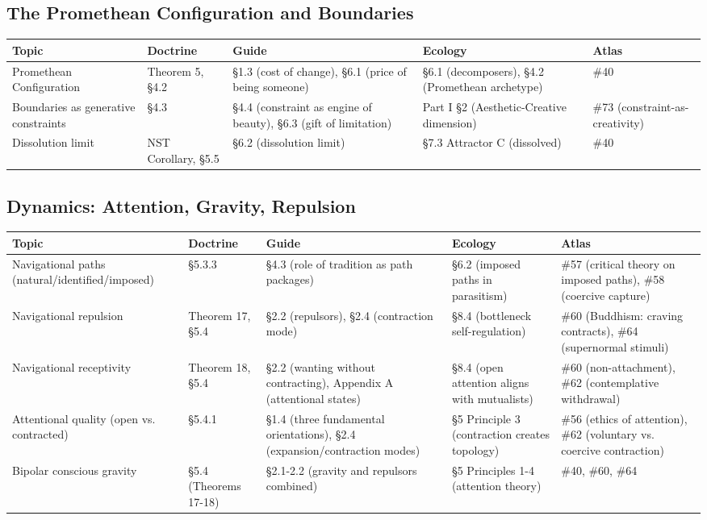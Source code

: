 \subsection*{The Promethean Configuration and Boundaries}



\begin{longtable}{p{} p{} p{} p{} p{}}
\toprule
\textbf{Topic} & \textbf{Doctrine} & \textbf{Guide} & \textbf{Ecology} & \textbf{Atlas} \\
\midrule
\endhead
Promethean Configuration & Theorem 5, §4.2 & §1.3 (cost of change), §6.1 (price of being someone) & §6.1 (decomposers), §4.2 (Promethean archetype) & \#40 \\
Boundaries as generative constraints & §4.3 & §4.4 (constraint as engine of beauty), §6.3 (gift of limitation) & Part I §2 (Aesthetic-Creative dimension) & \#73 (constraint-as-creativity) \\
Dissolution limit & NST Corollary, §5.5 & §6.2 (dissolution limit) & §7.3 Attractor C (dissolved) & \#40 \\
\bottomrule
\end{longtable}



\subsection*{Dynamics: Attention, Gravity, Repulsion}



\begin{longtable}{p{} p{} p{} p{} p{}}
\toprule
\textbf{Topic} & \textbf{Doctrine} & \textbf{Guide} & \textbf{Ecology} & \textbf{Atlas} \\
\midrule
\endhead
Navigational paths (natural/identified/imposed) & §5.3.3 & §4.3 (role of tradition as path packages) & §6.2 (imposed paths in parasitism) & \#57 (critical theory on imposed paths), \#58 (coercive capture) \\
Navigational repulsion & Theorem 17, §5.4 & §2.2 (repulsors), §2.4 (contraction mode) & §8.4 (bottleneck self-regulation) & \#60 (Buddhism: craving contracts), \#64 (supernormal stimuli) \\
Navigational receptivity & Theorem 18, §5.4 & §2.2 (wanting without contracting), Appendix A (attentional states) & §8.4 (open attention aligns with mutualists) & \#60 (non-attachment), \#62 (contemplative withdrawal) \\
Attentional quality (open vs. contracted) & §5.4.1 & §1.4 (three fundamental orientations), §2.4 (expansion/contraction modes) & §5 Principle 3 (contraction creates topology) & \#56 (ethics of attention), \#62 (voluntary vs. coercive contraction) \\
Bipolar conscious gravity & §5.4 (Theorems 17-18) & §2.1-2.2 (gravity and repulsors combined) & §5 Principles 1-4 (attention theory) & \#40, \#60, \#64 \\
\bottomrule
\end{longtable}



